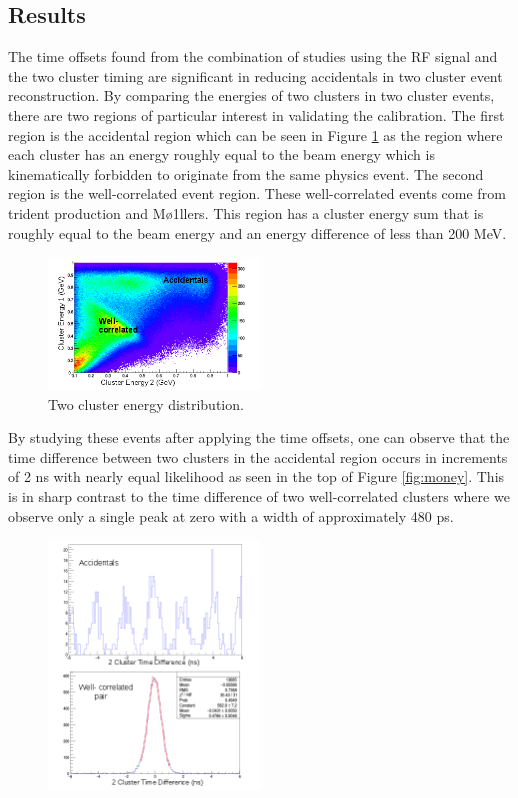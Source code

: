 \documentclass[twoside]{article}
\begin{document}
\begin{multicols}{2}

\section{Results}
The time offsets found from the combination of studies using the RF signal and the two cluster timing are significant in reducing accidentals in two cluster event reconstruction. By comparing the energies of two clusters in two cluster events, there are two regions of particular interest in validating the calibration. The first region is the accidental region which can be seen in Figure \ref{fig:2clus} as the region where each cluster has an energy roughly equal to the beam energy which is kinematically forbidden to originate from the same physics event. The second region is the well-correlated event region. These well-correlated events come from trident production and M\o 1llers. This region has a cluster energy sum that is roughly equal to the beam energy and an energy difference of less than 200 MeV. \\ 
\begin{figure}[H]
  \centering
      \includegraphics[width=0.5\textwidth]{2cluscolz.png}
  \caption{Two cluster energy distribution.}
\label{fig:2clus}
\end{figure}
By studying these events after applying the time offsets, one can observe that the time difference between two clusters in the accidental region occurs in increments of 2 ns with nearly equal likelihood as seen in the top of Figure \ref{fig:money}. This is in sharp contrast to the time difference of two well-correlated clusters where we observe only a single peak at zero with a width of approximately 480 ps. \\
\begin{figure}[H]
  \centering
      \includegraphics[width=0.5\textwidth]{2cluster.png}

\end{figure}
\end{multicols}
\end{document}
